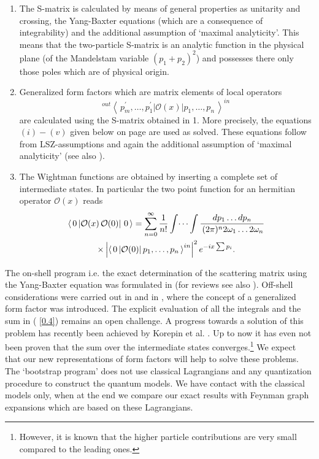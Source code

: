 \documentclass[a4paper,a4paper]{article}
\begin{document}
\begin{enumerate}
\item  The S-matrix is calculated by means of general properties as
unitarity and crossing, the Yang-Baxter equations (which are a consequence
of integrability) and the additional assumption of `maximal analyticity'.
This means that the two-particle S-matrix is an analytic function in the
physical plane (of the Mandelstam variable $(p_{1}+p_{2})^{2}$) and
possesses there only those poles which are of physical origin.

\item  Generalized form factors which are matrix elements of local operators 
\[
^{out}\left\langle \,p_{m}^{\prime },\ldots ,p_{1}^{\prime }\left| \mathcal{O%
}(x)\right| p_{1},\ldots ,p_{n}\,\right\rangle ^{in}\,
\]
are calculated using the S-matrix obtained in 1. More precisely, the
equations $(i)-(v)$ given below on page \pageref{pf} are used as solved.
These equations follow from LSZ-assumptions and again the additional
assumption of `maximal analyticity' (see also \cite{BFKZ}).

\item  The Wightman functions are obtained by inserting a complete set of
intermediate states. In particular the two point function for an hermitian
operator $\mathcal{O}(x)$ reads 
\begin{multline}
\langle \,0\left| \mathcal{O}(x)\,\mathcal{O}(0)\right| \,0\,\rangle
=\sum_{n=0}^{\infty }\frac{1}{n!}\int \dots \int \frac{dp_{1}\ldots dp_{n}}{%
\,(2\pi )^{n}2\omega _{1}\dots 2\omega _{n}}  \label{0.4} \\
\times \left| \left\langle \,0\left| \mathcal{O}(0)\right| p_{1},\ldots
,p_{n}\,\right\rangle ^{in}\right| ^{2}e^{-ix\sum p_{i}}.
\end{multline}
\end{enumerate}

The on-shell program i.e. the exact determination of the scattering matrix
using the Yang-Baxter equation was formulated in \cite{KTTW,KT} (for reviews
see also \cite{K,ZZ}). Off-shell considerations were carried out in \cite
{VG,W} and in \cite{KW,BKW}, where the concept of a generalized form factor
was introduced. The explicit evaluation of all the integrals and the sum in (%
\ref{0.4}) remains an open challenge. A progress towards a solution of this
problem has recently been achieved by Korepin et al. \cite{Korepin}. Up to
now it has even not been proven that the sum over the intermediate states
converges.\footnote{%
However, it is known \cite{CM} that the higher particle contributions are
very small compared to the leading ones.} We expect that our new
representations of form factors will help to solve these problems. The
`bootstrap program' does not use classical Lagrangians and any quantization
procedure to construct the quantum models. We have contact with the
classical models only, when at the end we compare our exact results with
Feynman graph expansions which are based on these Lagrangians.
\end{document}
